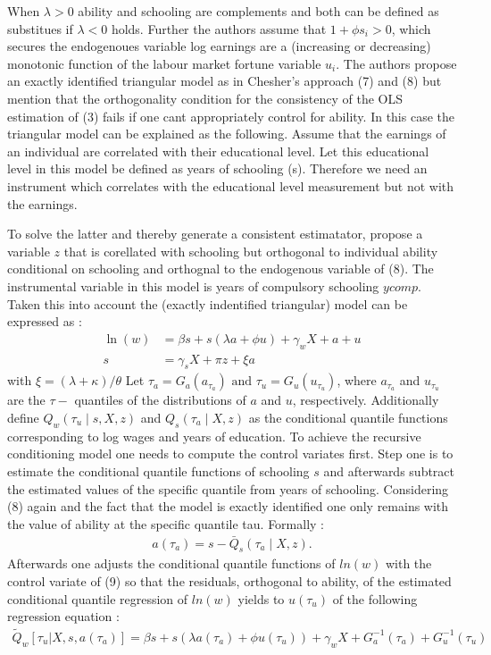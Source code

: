 \documentclass[12pt,a4paper]{article}
\begin{document}
When \(\lambda>0\) ability and schooling are complements and both can be
defined as substitues if \(\lambda<0\) holds. Further the authors assume
that \(1+ \phi s_i > 0\), which secures the endogenoues variable log
earnings are a (increasing or decreasing) monotonic function of the
labour market fortune variable \(u_i\). The authors propose an exactly
identified triangular model as in Chesher's approach (7) and (8) but
mention that the orthogonality condition for the consistency of the OLS
estimation of (3) fails if one cant appropriately control for ability.
In this case the triangular model can be explained as the following.
Assume that the earnings of an individual are correlated with their
educational level. Let this educational level in this model be defined
as years of schooling (s). Therefore we need an instrument which
correlates with the educational level measurement but not with the
earnings.

To solve the latter and thereby generate a consistent estimatator,
\textcite{brunello} propose a variable \(z\) that is corellated with
schooling but orthogonal to individual ability conditional on schooling
and orthognal to the endogenous variable of (8). The instrumental
variable in this model is years of compulsory schooling \(ycomp\). Taken
this into account the (exactly indentified triangular) model can be
expressed as :
\begin{align} \ln(w)&=\beta s+s(\lambda a+\phi u)+\gamma_{w} X+a+u \\
s&=\gamma_{s} X+\pi z+\xi a \end{align} with
\(\xi=(\lambda+\kappa) / \theta\) Let
\(\tau_{a}=G_{a}\left(a_{\tau_{a}}\right) \text { and } \tau_{u}=G_{u}\left(u_{\tau_{u}}\right)\),
where \(a_{\tau_{a}}\) and \(u_{\tau_{u}}\) are the \(\tau-\) quantiles
of the distributions of \(a\) and \(u\), respectively. Additionally
define \(Q_{w}\left(\tau_{u}\mid s,X,z\right)\) and
\(Q_{s}\left(\tau_{a}\mid X,z\right)\) as the conditional quantile
functions corresponding to log wages and years of education. To achieve
the recursive conditioning model one needs to compute the control
variates first. Step one is to estimate the conditional quantile
functions of schooling \(s\) and afterwards subtract the estimated
values of the specific quantile from years of schooling. Considering (8)
again and the fact that the model is exactly identified one only remains
with the value of ability at the specific quantile tau. Formally :
\begin{align}a\left(\tau_{a}\right)=s-\bar{Q}_{s}\left(\tau_{a}\mid X,z\right).\end{align}
Afterwards one adjusts the conditional quantile functions of \(ln(w)\)
with the control variate of (9) so that the residuals, orthogonal to
ability, of the estimated conditional quantile regression of \(ln(w)\)
yields to \(u(\tau_u)\) of the following regression equation :
\begin{align}
\tilde{Q}_w[\tau_u|X, s, a(\tau_a)] = \beta s + s(\lambda a(\tau_a) + \phi u(\tau_u)) + \gamma_w X + G_{a}^{-1}\left(\tau_{a}\right) + G_{u}^{-1}\left(\tau_{u}\right)
\end{align}
\end{document}
